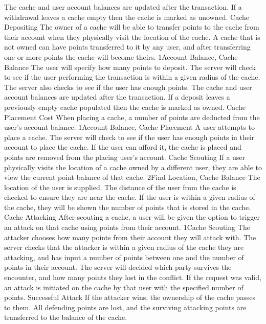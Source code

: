 			{The cache and user account balances are updated after the 
			transaction. If a withdrawal leaves a cache empty then the cache 
			is marked as unowned.}
		\funcreq
			{Cache Depositing}
			{The owner of a cache will be able to transfer points to the 
			cache from their account when they physically visit the location of 
			the cache. A cache that is not owned can have points transferred to it by any user, and after transferring one or more points the cache will become theirs.}
			{1}{Account Balance, Cache Balance}
			{The user will specify how many points to deposit.}
			{The server will check to see if the user performing the 
			transaction is within a given radius of the cache. The server also checks to see if the user has enough points.}
			{The cache and user account balances are updated after the 
			transaction. If a deposit leaves a previously empty cache  populated then the cache is marked as owned.}
		\funcreq
			{Cache Placement Cost}
			{When placing a cache, a number of points are deducted from the user's account balance.}
			{1}{Account Balance, Cache Placement}
			{A user attempts to place a cache.}
			{The server will check to see if the user has enough points in 
			their account to place the cache.}
			{If the user can afford it, the cache is placed and points are 
			removed from the placing user's account.}
		\funcreq
			{Cache Scouting}
			{If a user physically visits the location of a cache owned by a 
			different user, they are able to view the current point balance of 
			that cache.}
			{2}{Find Location, Cache Balance}
			{The location of the user is supplied.}
			{The distance of the user from the cache is checked to ensure they 
			are near the cache.}
			{If the user is within a given radius of the cache, they will be 
			shown the number of points that is stored in the cache.}
		\funcreq
			{Cache Attacking}
			{After scouting a cache, a user will be given the option to 
			trigger an attack on that cache using points from their account.}
			{1}{Cache Scouting}
			{The attacker chooses how many points from their account they will 
			attack with.}
			{The server checks that the attacker is within a given radius of 
			the cache they are attacking, and has input a number of points 
			between one and the number of points in their account. The server 
			will decided which party survives the encounter, and how many 
			points they lost in the conflict.}
			{If the request was valid, an attack is initiated on the cache by 
			that user with the specified number of points.}
		\funcreq
			{Successful Attack}
			{If the attacker wins, the ownership of the cache passes to them. 
			All defending points are lost, and the surviving attacking points 
			are transferred to the balance of the cache.}
